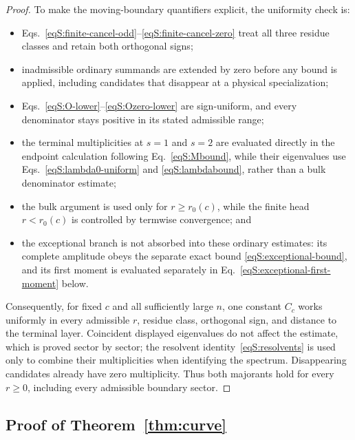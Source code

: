 \documentclass[journal,twocolumn]{IEEEtran}
\theoremstyle{definition}
\theoremstyle{plain}
\begin{document}
\begin{proof}
To make the moving-boundary quantifiers explicit, the uniformity check is:
\begin{itemize}
\item Eqs.~\eqref{eqS:finite-cancel-odd}--\eqref{eqS:finite-cancel-zero}
      treat all three residue classes and retain both orthogonal signs;
\item inadmissible ordinary summands are extended by zero before any bound is
      applied, including candidates that disappear at a physical
      specialization;
\item Eqs.~\eqref{eqS:O-lower}--\eqref{eqS:Ozero-lower} are sign-uniform,
      and every denominator stays positive in its stated admissible range;
\item the terminal multiplicities at $s=1$ and $s=2$ are evaluated directly
      in the endpoint calculation following Eq.~\eqref{eqS:Mbound}, while
      their eigenvalues use Eqs.~\eqref{eqS:lambda0-uniform} and
      \eqref{eqS:lambdabound}, rather than a bulk denominator estimate;
\item the bulk argument is used only for $r\geq r_0(c)$, while the finite
      head $r<r_0(c)$ is controlled by termwise convergence; and
\item the exceptional branch is not absorbed into these ordinary estimates:
      its complete amplitude obeys the separate exact bound
      \eqref{eqS:exceptional-bound}, and its first moment is evaluated
      separately in Eq.~\eqref{eqS:exceptional-first-moment} below.
\end{itemize}
Consequently, for fixed $c$ and all sufficiently large $n$, one constant
$C_c$ works uniformly in every admissible $r$, residue class, orthogonal
sign, and distance to the terminal layer.  Coincident displayed eigenvalues
do not affect the estimate, which is proved sector by sector; the resolvent
identity~\eqref{eqS:resolvents} is used only to combine their multiplicities
when identifying the spectrum.  Disappearing candidates already have zero
multiplicity.  Thus both majorants hold for every $r\geq0$, including every
admissible boundary sector.
\end{proof}

\subsection{Proof of Theorem~\ref{thm:curve}}
\label{app:proof-curve}
\end{document}
